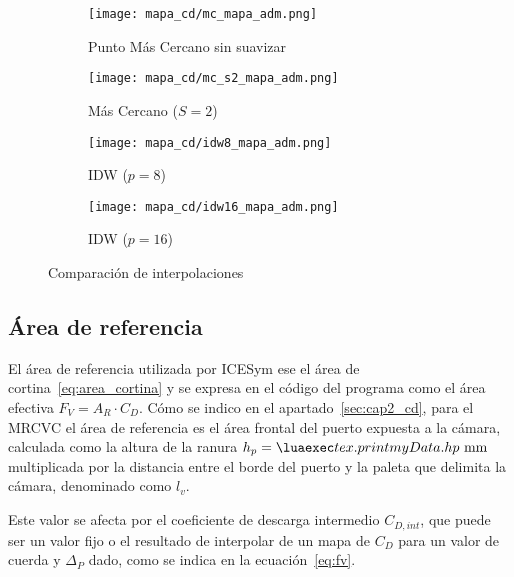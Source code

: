 \begin{figure}
    \centering
    \begin{subfigure}{0.4\textwidth}
        \centering
        \texttt{[image: mapa\_cd/mc\_mapa\_adm.png]}
        \caption{Punto Más Cercano sin suavizar}
    \end{subfigure}
    \hfill
    \begin{subfigure}{0.4\textwidth}
        \centering
        \texttt{[image: mapa\_cd/mc\_s2\_mapa\_adm.png]}
        \caption{Más Cercano ($S=2$)}
    \end{subfigure}
    \hfill
    \begin{subfigure}{0.4\textwidth}
        \centering
        \texttt{[image: mapa\_cd/idw8\_mapa\_adm.png]}
        \caption{IDW ($p=8$)}
    \end{subfigure}
    \hfill
    \begin{subfigure}{0.4\textwidth}
        \centering
        \texttt{[image: mapa\_cd/idw16\_mapa\_adm.png]}
        \caption{IDW ($p=16$)}
    \end{subfigure}
    \caption{Comparación de interpolaciones}\label{fig:mapas_interpolados}
\end{figure}


\subsection{Área de referencia}
%
El área de referencia utilizada por ICESym ese el área de
cortina~\ref{eq:area_cortina} y se expresa en el código del programa como el
área efectiva $F_{V}=A_{R}\cdot C_{D}$.
%
Cómo se indico en el apartado~\ref{sec:cap2_cd}, para el  MRCVC el área de
referencia es el área frontal del puerto expuesta a la cámara, calculada como la
altura de la ranura $h_{p}=\lua{tex.print{myData.hp}}\text{ mm}$ multiplicada
por la distancia entre el borde del puerto y la paleta que delimita la cámara,
denominado como $l_{v}$.

%
%
Este valor se afecta por el coeficiente de descarga intermedio $C_{D,int}$, que
puede ser un valor fijo o el resultado de interpolar de un mapa de $C_D$ para un
valor de cuerda y $\Delta_P$ dado, como se indica en la ecuación~\ref{eq:fv}.


